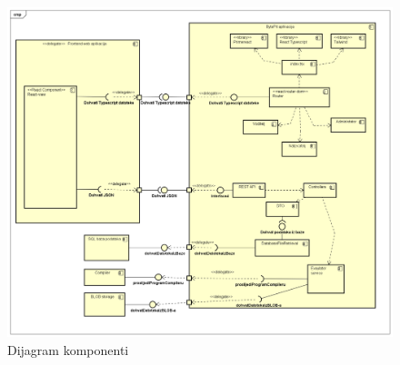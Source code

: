 			 \eject
			 
			 \begin{figure}[H]
			 	\includegraphics[scale=0.38]{slike/Dijagram_komp.PNG} %
			 	\centering
			 	\caption{Dijagram komponenti}
			 	\label{fig:komponente}
			 \end{figure}
			 
			 \eject